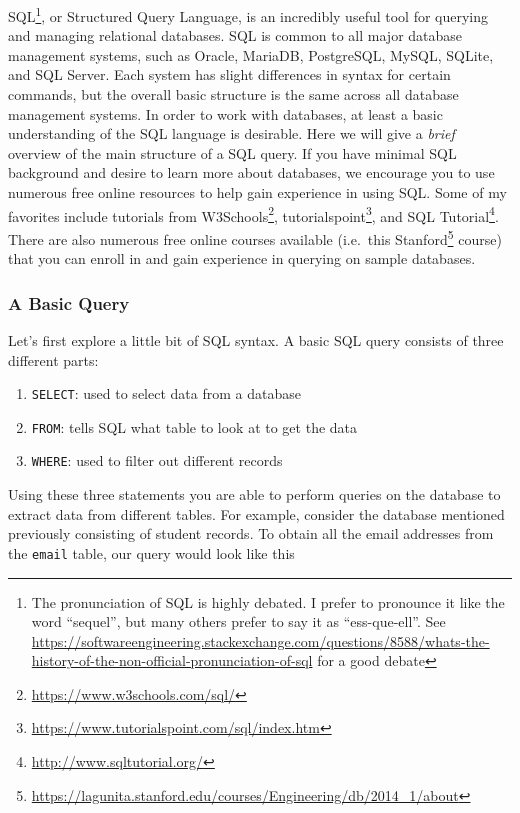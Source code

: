 \documentclass[
]{krantz}
\providecommand{\tightlist}{%
  \setlength{\itemsep}{0pt}\setlength{\parskip}{0pt}}
\renewcommand{\href}[2]{#2\footnote{\url{#1}}}
\begin{document}
SQL\footnote{The pronunciation of SQL is highly debated. I prefer to pronounce it like the word ``sequel'', but many others prefer to say it as ``ess-que-ell''. See \url{https://softwareengineering.stackexchange.com/questions/8588/whats-the-history-of-the-non-official-pronunciation-of-sql} for a good debate}, or Structured Query Language, is an incredibly useful tool for querying and managing relational databases. SQL is common to all major database management systems, such as Oracle, MariaDB, PostgreSQL, MySQL, SQLite, and SQL Server. Each system has slight differences in syntax for certain commands, but the overall basic structure is the same across all database management systems. In order to work with databases, at least a basic understanding of the SQL language is desirable. Here we will give a \emph{brief} overview of the main structure of a SQL query. If you have minimal SQL background and desire to learn more about databases, we encourage you to use numerous free online resources to help gain experience in using SQL. Some of my favorites include tutorials from \href{https://www.w3schools.com/sql/}{W3Schools}, \href{https://www.tutorialspoint.com/sql/index.htm}{tutorialspoint}, and \href{http://www.sqltutorial.org/}{SQL Tutorial}. There are also numerous free online courses available (i.e.~this \href{https://lagunita.stanford.edu/courses/Engineering/db/2014_1/about}{Stanford} course) that you can enroll in and gain experience in querying on sample databases.

\hypertarget{a-basic-query}{%
\subsubsection{A Basic Query}\label{a-basic-query}}

Let's first explore a little bit of SQL syntax. A basic SQL query consists of three different parts:

\begin{enumerate}
\def\labelenumi{\arabic{enumi}.}
\tightlist
\item
  \texttt{SELECT}: used to select data from a database
\item
  \texttt{FROM}: tells SQL what table to look at to get the data
\item
  \texttt{WHERE}: used to filter out different records
\end{enumerate}

Using these three statements you are able to perform queries on the database to extract data from different tables. For example, consider the database mentioned previously consisting of student records. To obtain all the email addresses from the \texttt{email} table, our query would look like this
\end{document}
